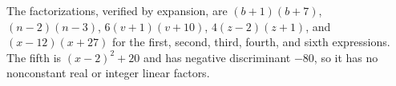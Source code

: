 The factorizations, verified by expansion, are $(b+1)(b+7)$, $(n-2)(n-3)$, $6(v+1)(v+10)$, $4(z-2)(z+1)$, and $(x-12)(x+27)$ for the first, second, third, fourth, and sixth expressions. The fifth is $(x-2)^2+20$ and has negative discriminant $-80$, so it has no nonconstant real or integer linear factors.
